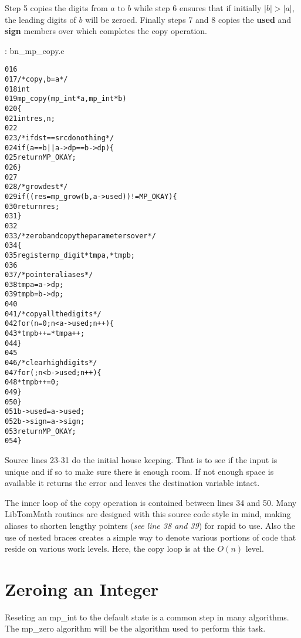 \documentclass[b5paper]{book}
\begin{document}
Step 5 copies the digits from $a$ to $b$ while step 6 ensures that if initially $\vert b \vert > \vert a \vert$,
the leading digits of $b$ will be zeroed.  Finally steps 7 and 8 copies the \textbf{used} and \textbf{sign} members over 
which completes the copy operation.

\vspace{+3mm}\begin{small}
\hspace{-5.1mm}{\bf File}: bn\_mp\_copy.c
\vspace{-3mm}
\begin{alltt}
016   
017   /* copy, b = a */
018   int
019   mp_copy (mp_int * a, mp_int * b)
020   \{
021     int     res, n;
022   
023     /* if dst == src do nothing */
024     if (a == b || a->dp == b->dp) \{
025       return MP_OKAY;
026     \}
027   
028     /* grow dest */
029     if ((res = mp_grow (b, a->used)) != MP_OKAY) \{
030       return res;
031     \}
032   
033     /* zero b and copy the parameters over */
034     \{
035       register mp_digit *tmpa, *tmpb;
036   
037       /* pointer aliases */
038       tmpa = a->dp;
039       tmpb = b->dp;
040   
041       /* copy all the digits */
042       for (n = 0; n < a->used; n++) \{
043         *tmpb++ = *tmpa++;
044       \}
045   
046       /* clear high digits */
047       for (; n < b->used; n++) \{
048         *tmpb++ = 0;
049       \}
050     \}
051     b->used = a->used;
052     b->sign = a->sign;
053     return MP_OKAY;
054   \}
\end{alltt}
\end{small}

Source lines 23-31 do the initial house keeping.  That is to see if the input is unique and if so to 
make sure there is enough room.  If not enough space is available it returns the error and leaves the destination variable
intact.

The inner loop of the copy operation is contained between lines 34 and 50.  Many LibTomMath routines are designed with this source code style
in mind, making aliases to shorten lengthy pointers (\textit{see line 38 and 39}) for rapid to use.  Also the
use of nested braces creates a simple way to denote various portions of code that reside on various work levels.  Here, the copy loop is at the 
$O(n)$ level.  

\section{Zeroing an Integer}
Reseting an mp\_int to the default state is a common step in many algorithms.  The mp\_zero algorithm will be the algorithm used to
perform this task.
\end{document}
